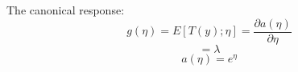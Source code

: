 \begin{answer}
The canonical response:
\[g(\eta) = E[T(y);\eta] = \frac{\partial a(\eta)}{\partial \eta} \]
\[= \lambda \]
\[a(\eta) = e^\eta \]

\end{answer}
